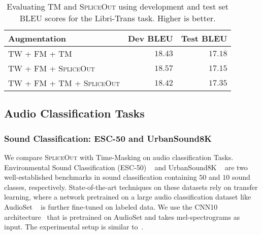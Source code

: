 \documentclass{article}
\newcommand{\SpA}{{\textsc{SpliceOut}}\xspace}
\begin{document}
\begin{table}[]
    \centering
    \caption{Evaluating TM and \SpA using development and test set BLEU scores for the Libri-Trans task. Higher is better.}
    \begin{tabular}{lrr}
    \toprule
    Augmentation & Dev BLEU & Test BLEU\\
    \midrule
         TW + FM + TM~\citep{specaugment,espnetst} & $18.43$ & $17.18$\\
         TW + FM + \SpA & $\mathbf{18.57}$ & $17.15$\\
         TW + FM + TM + \SpA & $18.42$ & $\mathbf{17.35}$\\
    \bottomrule
    \end{tabular}
    \label{tab:bleu}
\end{table}

\subsection{Audio Classification Tasks}

\subsubsection{Sound Classification: ESC-50 and UrbanSound8K}
\label{sec:soundclass}

We compare \SpA with Time-Masking on audio classification Tasks. Environmental Sound Classification (ESC-50) ~\citep{piczak2015dataset} and UrbanSound8K ~\citep{urban} are two well-established benchmarks in sound classification containing $50$ and $10$ sound classes, respectively. State-of-the-art techniques on these datasets rely on transfer learning, where a network pretrained on a large audio classification dataset like AudioSet ~\citep{audioset} is further fine-tuned on labeled data. We use the CNN10 architecture~\citep{panns} that is pretrained on AudioSet and takes mel-spectrograms as input. The experimental setup is similar to~\citep{urban}.
\end{document}
